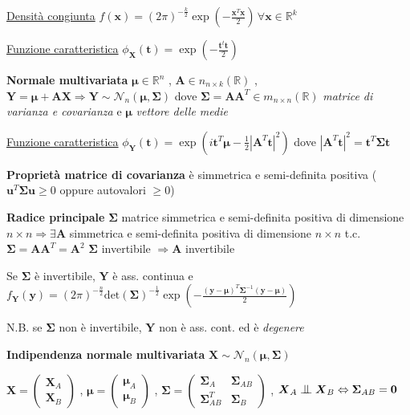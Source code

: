 \documentclass[openany]{book} %
\newcommand{\ind}{\mathrel{\text{\scalebox{1.07}{$\perp\mkern-10mu\perp$}}}}
\begin{document}
\underline{Densità congiunta} $f(\boldsymbol{x})=(2\pi)^{-\frac{k}{2}}\exp(-\frac{\boldsymbol{x}^T \boldsymbol{x}}{2})\,\forall \boldsymbol{x}\in \mathbb{R}^k$

\underline{Funzione caratteristica} $\phi_{\boldsymbol{X}}(\boldsymbol{t})=\exp(-\frac{\boldsymbol{t}^t \boldsymbol{t}}{2})$

\textbf{Normale multivariata} $\boldsymbol{\mu}\in \mathbb{R}^n$ , $\boldsymbol{A}\in n_{n\times k}(\mathbb{R})$ , $\boldsymbol{Y} = \boldsymbol{\mu}+\boldsymbol{AX}\Rightarrow \boldsymbol{Y}\sim \mathcal{N}_n(\boldsymbol{\mu},\boldsymbol{\Sigma})$ dove $\boldsymbol{\Sigma}=\boldsymbol{AA}^T\in m_{n\times n}(\mathbb{R})$ \textit{matrice di varianza e covarianza} e $\boldsymbol{\mu}$ \textit{vettore delle medie}

\underline{Funzione caratteristica} $\phi_{\boldsymbol{Y}}(\boldsymbol{t})=\exp(i \boldsymbol{t}^T \boldsymbol{\mu}-\frac{1}{2}|\boldsymbol{A}^T \boldsymbol{t}|^2)$ dove $|\boldsymbol{A}^T \boldsymbol{t}|^2 = \boldsymbol{t}^T \boldsymbol{\Sigma t}$

\textbf{Proprietà matrice di covarianza} è simmetrica e semi-definita positiva ($\boldsymbol{u}^T \boldsymbol{\Sigma u}\geq 0$ oppure autovalori $\geq 0$)

\textbf{Radice principale} $\boldsymbol{\Sigma}$ matrice simmetrica e semi-definita positiva di dimensione $n\times n \Rightarrow \exists \boldsymbol{A}$ simmetrica e semi-definita positiva di dimensione $n\times n$ t.c. $\boldsymbol{\Sigma}=\boldsymbol{AA}^T=\boldsymbol{A}^2$ \quad $\boldsymbol{\Sigma}$ invertibile $\Rightarrow \boldsymbol{A}$ invertibile

Se $\boldsymbol{\Sigma}$ è invertibile, $\boldsymbol{Y}$ è ass. continua e $f_{\boldsymbol{Y}}(\boldsymbol{y})=(2\pi)^{-\frac{n}{2}}\text{det}(\boldsymbol{\Sigma})^{-\frac{1}{2}}\exp(-\frac{(\boldsymbol{y}-\boldsymbol{\mu})^T \boldsymbol{\Sigma}^{-1}(\boldsymbol{y}-\boldsymbol{\mu})}{2})$

N.B. se $\boldsymbol{\Sigma}$ non è invertibile, $\boldsymbol{Y}$ non è ass. cont. ed è \textit{degenere}

\textbf{Indipendenza normale multivariata} $\boldsymbol{X}\sim \mathcal{N}_n(\boldsymbol{\mu},\boldsymbol{\Sigma})$

$\boldsymbol{X}=\left(\begin{array}{c}\boldsymbol{X}_A \\ \boldsymbol{X}_B\end{array}\right)$ , $\boldsymbol{\mu}=\left(\begin{array}{c}\boldsymbol{\mu}_A \\ \boldsymbol{\mu}_B\end{array}\right)$ , $\boldsymbol{\Sigma}=\left(\begin{array}{cc}\boldsymbol{\Sigma}_A & \boldsymbol{\Sigma}_{AB}\\ \boldsymbol{\Sigma}_{AB}^T & \boldsymbol{\Sigma}_B\end{array}\right)$ , $\boldsymbol{X}_A \ind \boldsymbol{X}_B \Leftrightarrow \boldsymbol{\Sigma}_{AB} = \boldsymbol{0}$
\end{document}
